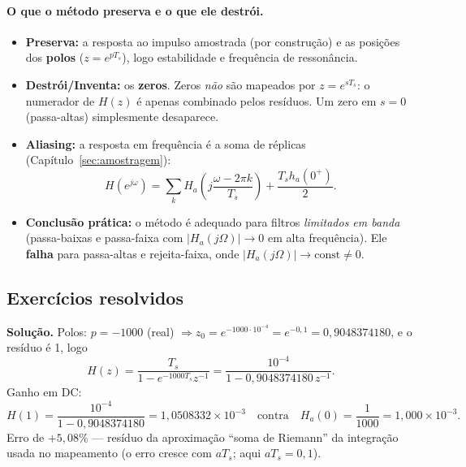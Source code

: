 \paragraph{O que o método preserva e o que ele destrói.}
\begin{itemize}
  \item \textbf{Preserva:} a resposta ao impulso amostrada (por construção) e
        as posições dos \textbf{polos} ($z=e^{pT_s}$), logo
        estabilidade e frequência de ressonância.
  \item \textbf{Destrói/Inventa:} os \textbf{zeros}. Zeros \emph{não} são
        mapeados por $z=e^{sT_s}$: o numerador de $H(z)$ é apenas combinado
        pelos resíduos. Um zero em $s=0$ (passa-altas) simplesmente
        desaparece.
  \item \textbf{Aliasing:} a resposta em frequência é a soma de réplicas
        (Capítulo~\ref{sec:amostragem}):
        \[
          H(e^{j\omega})=\sum_kH_a\!\left(j\frac{\omega-2\pi k}{T_s}\right)
          +\frac{T_sh_a(0^+)}{2}.
        \]
  \item \textbf{Conclusão prática:} o método é adequado para filtros
        \emph{limitados em banda} (passa-baixas e passa-faixa com
        $|H_a(j\Omega)|\to0$ em alta frequência). Ele \textbf{falha} para
        passa-altas e rejeita-faixa, onde $|H_a(j\Omega)|\to\text{const}\neq0$.
\end{itemize}


\subsection*{Exercícios resolvidos}


\textbf{Solução.} Polos: $p=-1000$ (real) $\Rightarrow z_0=e^{-1000\cdot10^{-4}}
=e^{-0{,}1}=0{,}9048374180$, e o resíduo é 1, logo
\[
  H(z)=\frac{T_s}{1-e^{-1000T_s}z^{-1}}
      =\frac{10^{-4}}{1-0{,}9048374180\,z^{-1}} .
\]
Ganho em DC:
\[
  H(1)=\frac{10^{-4}}{1-0{,}9048374180}=1{,}0508332\times10^{-3}
  \quad\text{contra}\quad H_a(0)=\frac{1}{1000}=1{,}000\times10^{-3}.
\]
Erro de $+5{,}08\%$ — resíduo da aproximação ``soma de Riemann'' da
integração usada no mapeamento (o erro cresce com $aT_s$; aqui
$aT_s=0{,}1$).

